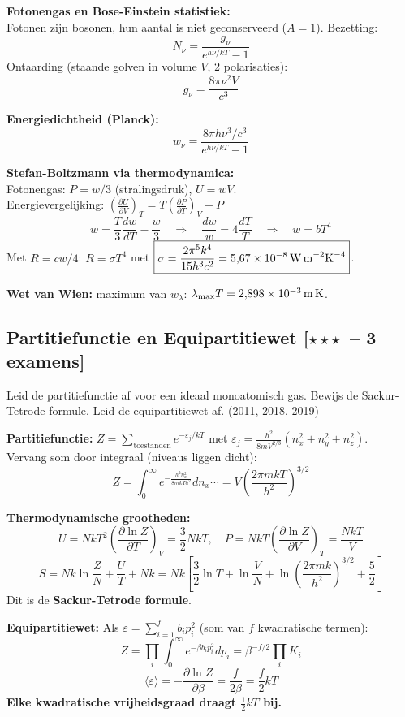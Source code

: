 \documentclass[10pt,a4paper]{article}
\newcommand{\pder}[2]{\left(\frac{\partial #1}{\partial #2}\right)}
\begin{document}
\begin{oplossing}
\textbf{Fotonengas en Bose-Einstein statistiek:}\\
Fotonen zijn bosonen, hun aantal is niet geconserveerd ($A=1$). Bezetting:
$$N_\nu = \frac{g_\nu}{e^{h\nu/kT}-1}$$
Ontaarding (staande golven in volume $V$, 2 polarisaties):
$$g_\nu = \frac{8\pi\nu^2 V}{c^3}$$

\textbf{Energiedichtheid (Planck):}
$$\boxed{w_\nu = \frac{8\pi h\nu^3/c^3}{e^{h\nu/kT}-1}}$$

\textbf{Stefan-Boltzmann via thermodynamica:}\\
Fotonengas: $P = w/3$ (stralingsdruk), $U = wV$.\\
Energievergelijking: $\pder{U}{V}_T = T\pder{P}{T}_V - P$
$$w = \frac{T}{3}\frac{dw}{dT} - \frac{w}{3} \quad \Rightarrow \quad \frac{dw}{w} = 4\frac{dT}{T} \quad \Rightarrow \quad w = bT^4$$
Met $R = cw/4$: $R = \sigma T^4$ met $\boxed{\sigma = \frac{2\pi^5 k^4}{15h^3c^2} = 5{,}67 \times 10^{-8}\,\text{W\,m}^{-2}\text{K}^{-4}}$.

\textbf{Wet van Wien:} maximum van $w_\lambda$: $\lambda_\text{max}T = 2{,}898 \times 10^{-3}\,\text{m\,K}$.
\end{oplossing}

\subsection{Partitiefunctie en Equipartitiewet \textnormal{\color{warningred}[$\star\star\star$\ -- 3 examens]}}

\begin{theorievraag}{Leid de partitiefunctie af voor een ideaal monoatomisch gas. Bewijs de Sackur-Tetrode formule. Leid de equipartitiewet af. \textnormal{(2011, 2018, 2019)}}
\end{theorievraag}

\begin{oplossing}
\textbf{Partitiefunctie:} $Z = \sum_\text{toestanden} e^{-\varepsilon_j/kT}$ met $\varepsilon_j = \frac{h^2}{8mV^{2/3}}(n_x^2+n_y^2+n_z^2)$.\\
Vervang som door integraal (niveaus liggen dicht):
$$Z = \int_0^\infty e^{-\frac{h^2 n_x^2}{8mkTa^2}} dn_x \cdots = V\!\left(\frac{2\pi mkT}{h^2}\right)^{3/2}$$

\textbf{Thermodynamische grootheden:}
$$U = NkT^2\pder{\ln Z}{T}_V = \frac{3}{2}NkT, \quad P = NkT\pder{\ln Z}{V}_T = \frac{NkT}{V}$$
$$S = Nk\ln\frac{Z}{N} + \frac{U}{T} + Nk = Nk\!\left[\frac{3}{2}\ln T + \ln\frac{V}{N} + \ln\!\left(\frac{2\pi mk}{h^2}\right)^{3/2} + \frac{5}{2}\right]$$
Dit is de \textbf{Sackur-Tetrode formule}.

\textbf{Equipartitiewet:} Als $\varepsilon = \sum_{i=1}^f b_i p_i^2$ (som van $f$ kwadratische termen):
$$Z = \prod_i \int_0^\infty e^{-\beta b_i p_i^2} dp_i = \beta^{-f/2} \prod_i K_i$$
$$\langle\varepsilon\rangle = -\frac{\partial \ln Z}{\partial\beta} = \frac{f}{2\beta} = \frac{f}{2}kT$$
\textbf{Elke kwadratische vrijheidsgraad draagt $\frac{1}{2}kT$ bij.}
\end{oplossing}
\end{document}
